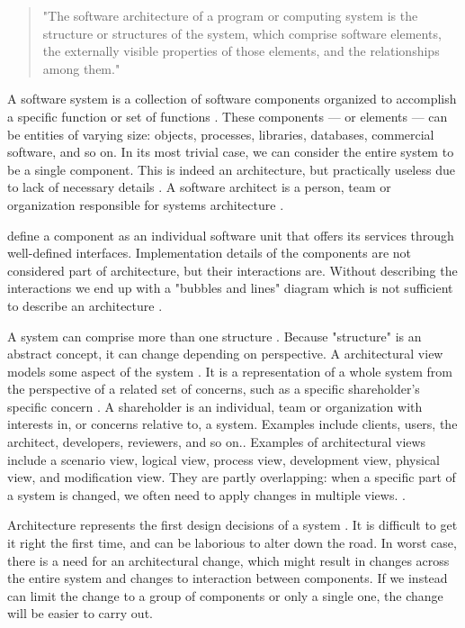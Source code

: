 \documentclass[utf8,english]{gradu3}
\begin{document}
\begin{quote}
  "The software architecture of a program or computing system is the structure or
  structures of the system, which comprise software elements, the externally
  visible properties of those elements, and the relationships among them."
\end{quote}

A software system is a collection of software components organized to accomplish
a specific function or set of functions \parencite[3]{IEEE42010}. These components --- or
elements --- can be entities of varying size: objects, processes, libraries,
databases, commercial software, and so on. In its most trivial case, we can
consider the entire system to be a single component. This is indeed an
architecture, but practically useless due to lack of necessary details
\parencite[24]{Bass1998}. A software architect is a person, team or organization
responsible for systems architecture \parencite[3]{IEEE42010}.

\textcite[53]{Koskimies2005} define a component as an individual software
unit that offers its services through well-defined interfaces. Implementation
details of the components are not considered part of architecture, but their
interactions are. Without describing the interactions we end up with a "bubbles
and lines" diagram which is not sufficient to describe an architecture
\parencite[24]{Bass1998}.

A system can comprise more than one structure \parencite[23]{Bass1998}. Because
"structure" is an abstract concept, it can change depending on perspective. A
architectural view models some aspect of the system \parencite{Koskimies2005}. It is a
representation of a whole system from the perspective of a related set of
concerns, such as a specific shareholder's specific concern \parencite[3]{IEEE42010}. A
shareholder is an individual, team or organization with interests in, or
concerns relative to, a system. Examples include clients, users, the architect,
developers, reviewers, and so on.\parencite[3]{IEEE42010}. Examples of architectural
views include a scenario view, logical view, process view,
development view, physical view, and modification view. They are partly
overlapping: when a specific part of a system is changed, we often need to apply
changes in multiple views. \parencite{Koskimies2005}.

Architecture represents the first design decisions of a system \parencite{Bass1998}. It is
difficult to get it right the first time, and can be laborious to alter down the
road. In worst case, there is a need for an architectural change, which might
result in changes across the entire system and changes to interaction between
components. If we instead can limit the change to a group of components or only
a single one, the change will be easier to carry out. \parencite[31]{Bass1998}
\end{document}
